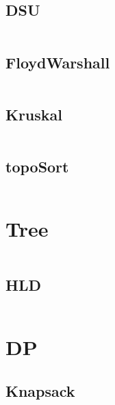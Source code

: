 \documentclass[10pt]{article}
\begin{document}
				\subsection{DSU}
					\inputminted[tabsize=2,breaklines,fontsize=\small, style=bw]{c++}{Graph/DSU.cpp}
				\subsection{FloydWarshall}
					\inputminted[tabsize=2,breaklines,fontsize=\small, style=bw]{c++}{Graph/floydWarshall.cpp}
				\subsection{Kruskal}
					\inputminted[tabsize=2,breaklines,fontsize=\small, style=bw]{c++}{Graph/Kruskal.cpp}
				\subsection{topoSort}
					\inputminted[tabsize=2,breaklines,fontsize=\small, style=bw]{c++}{Graph/topoSort.cpp}
			\section{Tree}
				\inputminted[tabsize=2,breaklines,fontsize=\small, style=bw]{c++}{Graph/Tree.cpp}
				\subsection{HLD}
					\inputminted[tabsize=2,breaklines,fontsize=\small, style=bw]{c++}{Graph/HLD.cpp}
			\section{DP}
				\subsection{Knapsack}
					\inputminted[tabsize=2,breaklines,fontsize=\small, style=bw]{c++}{Memorizacion/Knapsack.cpp}
		
		
	
\end{document}
